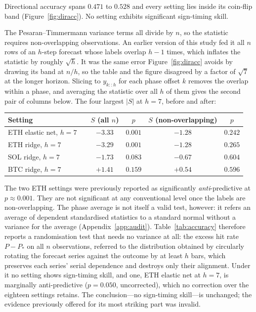 \documentclass{article}
\theoremstyle{plain}
\theoremstyle{definition}
\begin{document}
Directional accuracy spans $0.471$ to $0.528$ and every setting lies inside its
coin-flip band (Figure~\ref{fig:diracc}). No setting exhibits significant
sign-timing skill.

The Pesaran--Timmermann variance terms all divide by $n$, so the statistic requires
non-overlapping observations. An earlier version of this study fed it all $n$ rows of
an $h$-step forecast whose labels overlap $h-1$ times, which inflates the statistic by
roughly $\sqrt{h}$. It was the same error Figure~\ref{fig:diracc} avoids by drawing
its band at $n/h$, so the table and the figure disagreed by a factor of $\sqrt{7}$ at
the longer horizon. Slicing to $y_{k::h}$ for each phase offset $k$ removes the overlap within
a phase, and averaging the statistic over all $h$ of them gives the second pair of columns
below. The four largest $|S|$ at $h=7$, before and after:

\begin{center}
  \small
  \begin{tabular}{llcccc}
    \toprule
    Setting & & $S$ (all $n$) & $p$ & $S$ (non-overlapping) & $p$ \\
    \midrule
    ETH elastic net, $h=7$ & & $-3.33$ & $0.001$ & $-1.28$ & $0.242$ \\
    ETH ridge, $h=7$       & & $-3.29$ & $0.001$ & $-1.28$ & $0.265$ \\
    SOL ridge, $h=7$       & & $-1.73$ & $0.083$ & $-0.67$ & $0.604$ \\
    BTC ridge, $h=7$       & & $+1.41$ & $0.159$ & $+0.54$ & $0.596$ \\
    \bottomrule
  \end{tabular}
\end{center}

The two ETH settings were previously reported as significantly
\emph{anti}-predictive at $p \approx 0.001$. They are not significant at any
conventional level once the labels are non-overlapping. The phase average is not itself a
valid test, however: it refers an average of dependent standardised statistics to a standard
normal without a variance for the average (Appendix~\ref{app:audit}). Table~\ref{tab:accuracy}
therefore reports a randomisation test that needs no variance at all: the excess hit rate
$P-P_\ast$ on all $n$ observations, referred to the distribution obtained by circularly
rotating the forecast series against the outcome by at least $h$ bars, which preserves each
series' serial dependence and destroys only their alignment. Under it no setting shows
sign-timing skill, and one, ETH elastic net at $h=7$, is marginally anti-predictive
($p=0.050$, uncorrected), which no correction over the eighteen settings retains. The
conclusion---no sign-timing skill---is unchanged; the evidence previously offered for its most
striking part was invalid.
\end{document}
